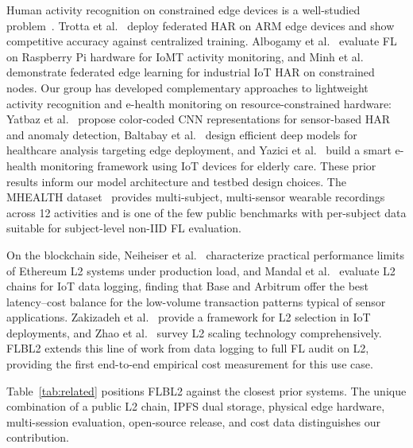 \documentclass{llncs}
\begin{document}
Human activity recognition on constrained edge devices is a well-studied
problem~\cite{aouedi2024harsurvey,shiri2025dlharsurvey}. Trotta et
al.~\cite{trotta2024edgehar} deploy federated HAR on ARM edge devices and
show competitive accuracy against centralized training. Albogamy et
al.~\cite{albogamy2025iotfl} evaluate FL on Raspberry Pi hardware for
IoMT activity monitoring, and Minh et al.~\cite{minh2025iiot} demonstrate
federated edge learning for industrial IoT HAR on constrained nodes. Our
group has developed complementary approaches to lightweight activity
recognition and e-health monitoring on resource-constrained hardware:
Yatbaz et al.~\cite{yatbaz2021activity} propose color-coded CNN
representations for sensor-based HAR and anomaly detection, Baltabay et
al.~\cite{baltabay2023lightweight} design efficient deep models for
healthcare analysis targeting edge deployment, and Yazici et
al.~\cite{yazici2023ehealth} build a smart e-health monitoring framework
using IoT devices for elderly care. These prior results inform our model
architecture and testbed design choices. The MHEALTH
dataset~\cite{banos2014mhealth} provides multi-subject, multi-sensor
wearable recordings across 12 activities and is one of the few public
benchmarks with per-subject data suitable for subject-level non-IID FL
evaluation.

On the blockchain side, Neiheiser et al.~\cite{neiheiser2023l2limits}
characterize practical performance limits of Ethereum L2 systems under
production load, and Mandal et al.~\cite{mandal2023l2} evaluate L2 chains
for IoT data logging, finding that Base and Arbitrum offer the best
latency--cost balance for the low-volume transaction patterns typical of
sensor applications. Zakizadeh et al.~\cite{zakizadeh2025l2select} provide
a framework for L2 selection in IoT deployments, and Zhao et
al.~\cite{zhao2024l2intro} survey L2 scaling technology comprehensively.
FLBL2 extends this line of work from data logging to full FL audit on L2,
providing the first end-to-end empirical cost measurement for this use case.

Table~\ref{tab:related} positions FLBL2 against the closest prior systems.
The unique combination of a public L2 chain, IPFS dual storage, physical
edge hardware, multi-session evaluation, open-source release, and cost data
distinguishes our contribution.
\end{document}
